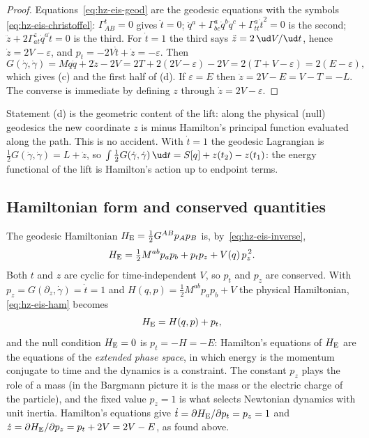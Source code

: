 \begin{proof}
Equations~\eqref{eq:hz-eis-geod} are the geodesic equations with the symbols
\eqref{eq:hz-eis-christoffel}: $\Gamma^t_{AB}=0$ gives $\ddot t=0$;
$\ddot q^a+\Gamma^a_{bc}\dot q^b\dot q^c+\Gamma^a_{tt}\dot t^2=0$ is the second;
$\ddot z+2\Gamma^z_{at}\dot q^a\dot t=0$ is the third. For $\dot t=1$ the third says
$\ddot z=2\,\ud V/\ud t$, hence $\dot z=2V-\varepsilon$, and $p_t=-2V\dot t+\dot z=-\varepsilon$.
Then
\[
  G(\dot\gamma,\dot\gamma)=M\dot q\dot q+2\dot z-2V
  =2T+2(2V-\varepsilon)-2V=2(T+V-\varepsilon)=2(E-\varepsilon),
\]
which gives (c) and the first half of (d). If $\varepsilon=E$ then
$\dot z=2V-E=V-T=-L$. The converse is immediate by defining
$z$ through $\dot z=2V-\varepsilon$.
\end{proof}

\begin{remark}\label{rem:hz-z-action}
Statement (d) is the geometric content of the lift: along the physical
(null) geodesics the new coordinate $z$ is minus Hamilton's principal
function evaluated along the path. This is no accident. With $\dot t=1$ the
geodesic Lagrangian is $\tfrac12G(\dot\gamma,\dot\gamma)=L+\dot z$, so
$\int\tfrac12G(\dot\gamma,\dot\gamma)\,\ud t=S[q]+z(t_2)-z(t_1)$:
the energy functional of the lift is Hamilton's action up to endpoint terms.
\end{remark}

\subsection{Hamiltonian form and conserved quantities}

The geodesic Hamiltonian $H_{\rm E}=\tfrac12G^{AB}p_Ap_B$ is, by~\eqref{eq:hz-eis-inverse},
\begin{equation}\label{eq:hz-eis-ham}
  H_{\rm E}=\tfrac12M^{ab}p_ap_b+p_tp_z+V(q)\,p_z^{\,2}.
\end{equation}
Both $t$ and $z$ are cyclic for time-independent $V$, so $p_t$ and $p_z$ are conserved.
With $p_z=G(\partial_z,\dot\gamma)=\dot t=1$ and
$H(q,p)=\tfrac12M^{ab}p_ap_b+V$ the physical Hamiltonian, \eqref{eq:hz-eis-ham} becomes
\[
  H_{\rm E}=H(q,p)+p_t ,
\]
and the null condition $H_{\rm E}=0$ is $p_t=-H=-E$: Hamilton's equations of $H_{\rm E}$
are the equations of the \emph{extended phase space}, in which energy is the momentum conjugate
to time and the dynamics is a constraint. The constant $p_z$ plays the role of a mass
(in the Bargmann picture it is the mass or the electric charge of the particle), and the
fixed value $p_z=1$ is what selects Newtonian dynamics with unit
inertia. Hamilton's equations give $\dot t=\partial H_{\rm E}/\partial p_t=p_z=1$ and
$\dot z=\partial H_{\rm E}/\partial p_z=p_t+2V=2V-E$, as found above.

